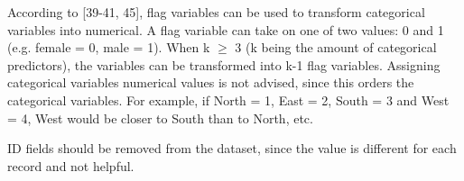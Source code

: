 According to \textcite{DataMiningAndPredictiveAnalytics}[39-41, 45], flag variables can be used to transform categorical variables into numerical. A flag variable can take on one of two values: 0 and 1 (e.g. female = 0, male = 1). When k $\geq$ 3 (k being the amount of categorical predictors), the variables can be transformed into k-1 flag variables. Assigning categorical variables numerical values is not advised, since this orders the categorical variables. For example, if North = 1, East = 2, South = 3 and West = 4, West would be closer to South than to North, etc.


ID fields should be removed from the dataset, since the value is different for each record and not helpful.




